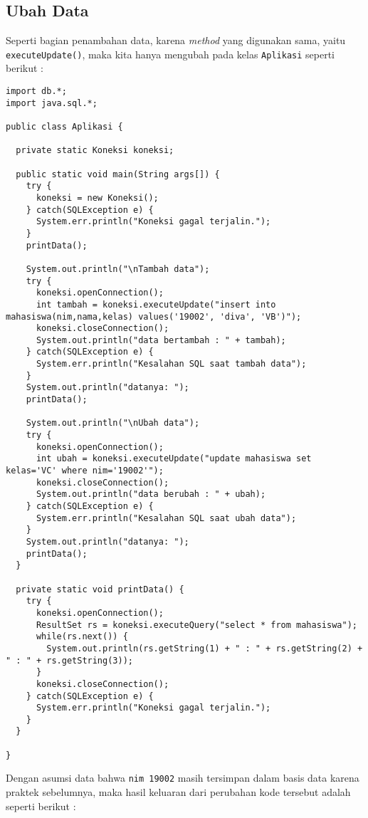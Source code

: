 \subsection{Ubah Data}

Seperti bagian penambahan data, karena \textit{method} yang digunakan sama, yaitu \texttt{executeUpdate()}, maka kita hanya mengubah pada kelas \texttt{Aplikasi} seperti berikut :

\begin{lstlisting}
import db.*;
import java.sql.*;

public class Aplikasi {

  private static Koneksi koneksi;
  
  public static void main(String args[]) {
    try {
      koneksi = new Koneksi();
    } catch(SQLException e) {
      System.err.println("Koneksi gagal terjalin.");
    }
    printData();
    
    System.out.println("\nTambah data");
    try {
      koneksi.openConnection();
      int tambah = koneksi.executeUpdate("insert into mahasiswa(nim,nama,kelas) values('19002', 'diva', 'VB')");
      koneksi.closeConnection();
      System.out.println("data bertambah : " + tambah);
    } catch(SQLException e) {
      System.err.println("Kesalahan SQL saat tambah data");
    }
    System.out.println("datanya: ");
    printData();
    
    System.out.println("\nUbah data");
    try {
      koneksi.openConnection();
      int ubah = koneksi.executeUpdate("update mahasiswa set kelas='VC' where nim='19002'");
      koneksi.closeConnection();
      System.out.println("data berubah : " + ubah);
    } catch(SQLException e) {
      System.err.println("Kesalahan SQL saat ubah data");
    }
    System.out.println("datanya: ");
    printData();
  }
  
  private static void printData() {
    try {
      koneksi.openConnection();
      ResultSet rs = koneksi.executeQuery("select * from mahasiswa");
      while(rs.next()) {
        System.out.println(rs.getString(1) + " : " + rs.getString(2) + " : " + rs.getString(3));
      }
      koneksi.closeConnection();
    } catch(SQLException e) {
      System.err.println("Koneksi gagal terjalin.");
    }
  }
  
}
\end{lstlisting}

Dengan asumsi data bahwa \texttt{nim 19002} masih tersimpan dalam basis data karena praktek sebelumnya, maka hasil keluaran dari perubahan kode tersebut adalah seperti berikut :

